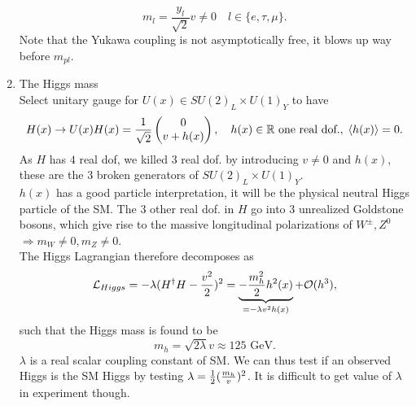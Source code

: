 \begin{enumerate}
	\begin{equation}
	m_l = \frac{y_l}{\sqrt{2}} v \neq 0 \quad l\in\{e,\tau,\mu\}.
	\end{equation}
	Note that the Yukawa coupling is not asymptotically free, it blows up way before $m_{pl}$.
	\item The Higgs mass\\
	Select unitary gauge for $U(x) \in SU(2)_L\times U(1)_Y$ to have
	\begin{equation}
	H(x) \rightarrow U(x) H(x) = \frac{1}{\sqrt{2}} \begin{pmatrix}
	0 \\
	v+h(x)\\
	\end{pmatrix}, \quad h(x) \in \mathbb{R} \text{ one real dof.}, \; \expval{h(x) }=0.
	\end{equation}
	As $H$ has $4$ real dof, we killed $3$ real dof. by introducing $v\neq 0$ and $h(x)$, these are the $3$ broken generators of $SU(2)_L\times U(1)_Y$.\\
	$h(x)$ has a good particle interpretation, it will be the physical neutral Higgs particle of the SM. The $3$ other real dof. in $H$ go into $3$ unrealized Goldstone bosons, which give rise to the massive longitudinal polarizations of $W^\pm, Z^0$ $\Rightarrow m_W\neq 0, m_Z\neq 0$.\\
	The Higgs Lagrangian therefore decomposes as
	\begin{equation}
	\mathcal{L}_{Higgs} = - \lambda ( H^\dagger H - \frac{v^2}{2})^2 = \underbrace{ -  \frac{m^2_h}{2} h^2(x)}_{=-\lambda v^2 h(x)} + \mathcal{O}(h^3),
	\end{equation}
	such that the Higgs mass is found to be
	\begin{equation}
	m_h=\sqrt{2 \lambda } v \approx 125 \text{ GeV}.
	\end{equation}
	$\lambda$ is a real scalar coupling constant of SM. We can thus test if an observed Higgs is the SM Higgs by testing $\lambda = \frac{1}{2} (\frac{m_h}{v})^2$. It is difficult to get value of $\lambda$ in experiment though. 
	
\end{enumerate}
